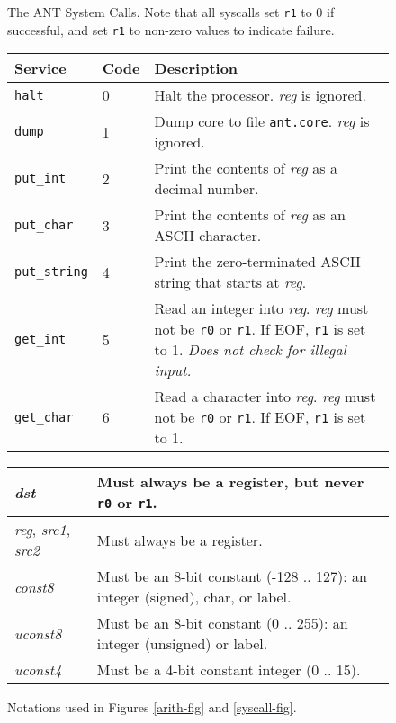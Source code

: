 \begin{figure*}
{\vspace{5mm}
\caption{ \label{syscall-fig} The ANT System Calls.
Note that all syscalls set {\tt r1} to 0 if successful, and set {\tt r1} to
non-zero values to indicate failure. }
\vspace{3mm}

\noindent
\begin{tabular}{|p{0.8in}|p{0.4in}|p{4.2in}|}
\hline
{\bf Service}   & {\bf Code}    & {\bf Description} \\
\hline
{\tt halt}              & 0     & Halt the processor.
				{\em reg} is ignored.  \\
{\tt dump}              & 1     & Dump core to file {\tt ant.core}.
				{\em reg} is ignored.  \\
\hline
{\tt put\_int}           & 2     & Print the contents of {\em reg} as a
					decimal number.
                                        \\
{\tt put\_char}          & 3     & Print the contents of {\em reg} as an
                                        ASCII character.
                                        \\
{\tt put\_string}        & 4     & Print the zero-terminated ASCII string that
                                starts at {\em reg}.
                                        \\
\hline
{\tt get\_int}           & 5     &
                                Read an integer into {\em reg}.  {\em reg}
                                must not be {\tt r0} or {\tt r1}.  If
                                EOF, {\tt r1} is set to 1.  {\em Does
                                not check for illegal input.} \\
{\tt get\_char}          & 6     &
                                Read a character into {\em reg}.  {\em reg}
                                must not be {\tt r0} or {\tt r1}.  If
                                EOF, {\tt r1} is set to 1. \\
\hline
\end{tabular}

\vspace{5mm}
\caption{ \label{notations} Notations used in Figures
		\ref{arith-fig} and \ref{syscall-fig}. }
\vspace{3mm}

\noindent
\begin{tabular}{|p{0.8in}|p{4.4in}|}
\hline
{\em dst}       & Must always be a register, but never {\tt r0} or {\tt r1}. \\
\hline
{\em reg}, {\em src1}, {\em src2}       & Must always be a register. \\
\hline
{\em const8}     & Must be an 8-bit constant (-128 .. 127):
			an integer (signed), char, or label. \\
\hline
{\em uconst8}	& Must be an 8-bit constant (0 .. 255):
			an integer (unsigned) or label. \\
\hline
{\em uconst4}	& Must be a 4-bit constant integer (0 .. 15). \\
\hline
\end{tabular}

}
\end{figure*}

